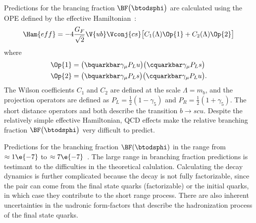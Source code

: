 Predictions for the brancing fraction $\BF\big(\btodsphi\big)$ are calculated using the OPE defined
by the effective Hamiltonian~\cite{Zou:2009zza,Mohanta:2002wf,PhysRevD.76.057701,Lu:2001yz}:
\begin{equation}
  \Ham{eff}=
  -4\frac{G_F}{\sqrt{2}} \V{ub}\Vconj{cs}
  \big[
    C_1(\Lambda)\Op{1}+C_2(\Lambda)\Op{2}
    \big]
\end{equation}
where
\begin{align}
  \Op{1} &= \big(\bquarkbar\gamma_\mu P_Lu\big) \big(\cquarkbar\gamma_\mu P_Ls\big) \nonumber\\
  \Op{2} &= \big(\bquarkbar\gamma_\mu P_Ls\big) \big(\cquarkbar\gamma_\mu P_Lu\big).
\end{align}
The Wilson coefficients $C_1$ and $C_2$ are defined at the scale $\Lambda=m_b$,
and the projection operators are defined as $P_L=\tfrac12(1-\gamma_5)$ and
$P_R=\tfrac12(1+\gamma_5)$.
The short distance operators  and  both describe the transition $b\!\to scu$.
Despite the relatively simple effective Hamiltonian, QCD effects make the relative branching
fraction $\BF\big(\btodsphi\big)$ very difficult to predict.

Predictions for the branching fraction $\BF(\btodsphi)$ in the \sm range from
$\approx1\e{-7}$ to
$\approx7\e{-7}$~\cite{Zou:2009zza,Mohanta:2002wf,PhysRevD.76.057701,Lu:2001yz}.
The large range in branching fraction predictions is testimant to the difficulties in the
theoretical calulation.
Calculating the decay dynamics is further complicated because the decay \btodsphi is not fully
factorizable, since the \ssbar pair can come from the final state quarks (factorizable) or the
initial quarks, in which case they contribute to the short range process.
There are also inherent uncertainties in the uadronic form-factors that describe the hadronization
process of the final state quarks.


